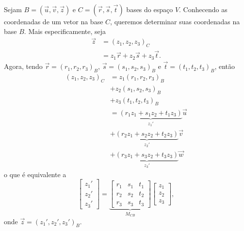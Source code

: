 Sejam $B = (\vec{u}, \vec{v}, \vec{z})$ e $C = (\vec{r}, \vec{s}, \vec{t})$ bases do espaço $V$. Conhecendo as coordenadas de um vetor na base $C$, queremos determinar suas coordenadas na base $B$. Mais especificamente, seja
\begin{align}
  \vec{z} &= (z_1, z_2, z_3)_C\\
  &= z_1\vec{r} + z_2\vec{s} + z_3\vec{t}.
\end{align}
Agora, tendo $\vec{r} = (r_1, r_2, r_3)_B$, $\vec{s} = (s_1, s_2, s_3)_B$ e $\vec{t} = (t_1, t_2, t_3)_B$, então
\begin{align}
  (z_1, z_2, z_3)_C &= z_1(r_1, r_2, r_3)_B \\
                    &+ z_2(s_1, s_2, s_3)_B \\
                    &+ z_3(t_1, t_2, t_3)_B\\
                    &= \underbrace{(r_1z_1+s_1z_2+t_1z_3)}_{z_1'}\vec{u}\\
                    &+ \underbrace{(r_2z_1+s_2z_2+t_2z_3)}_{z_2'}\vec{v}\\
                    &+ \underbrace{(r_3z_1+s_3z_2+t_3z_3)}_{z_3'}\vec{w}
\end{align}
o que é equivalente a
\begin{equation}\label{eq:cbsmb_mcb}
  \begin{bmatrix}
    z_1'\\
    z_2'\\
    z_3'
  \end{bmatrix} =
  \underbrace{\begin{bmatrix}
    r_1 & s_1 & t_1\\
    r_2 & s_2 & t_2\\
    r_3 & s_3 & t_3
  \end{bmatrix}}_{M_{CB}}
  \begin{bmatrix}
    z_1\\
    z_2\\
    z_3
  \end{bmatrix},
\end{equation}
onde $\vec{z} = (z_1', z_2', z_3')_B$.


